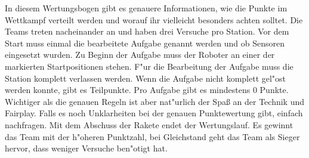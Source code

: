\documentclass[
	ngerman,
	accentcolor=1c,%
	]{tudapub}
\begin{document}
\bigskip
In diesem Wertungsbogen gibt es genauere Informationen, wie die Punkte im Wettkampf verteilt werden und worauf ihr vielleicht besonders achten solltet.
Die Teams treten nacheinander an und haben drei Versuche pro Station.
Vor dem Start muss einmal die bearbeitete Aufgabe genannt werden und ob Sensoren eingesetzt wurden.
Zu Beginn der Aufgabe muss der Roboter an einer der markierten Startpositionen stehen. F"ur die Bearbeitung der Aufgabe muss die Station komplett verlassen werden.
Wenn die Aufgabe nicht komplett gel"ost werden konnte, gibt es Teilpunkte. Pro Aufgabe gibt es mindestens 0 Punkte.\\
Wichtiger als die genauen Regeln ist aber nat"urlich der Spa\ss{} an der Technik und Fairplay.
Falls es noch Unklarheiten bei der genauen Punktewertung gibt, einfach nachfragen.
Mit dem Abschuss der Rakete endet der Wertungslauf.
Es gewinnt das Team mit der h"oheren Punktzahl, bei Gleichstand geht das Team als Sieger hervor, dass weniger Versuche ben"otigt hat.\\
\end{document}

